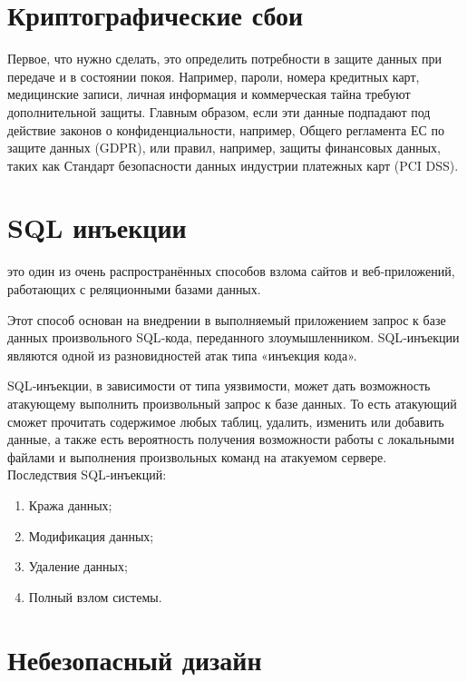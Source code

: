 \vspace{20pt}
{\let\clearpage\relax \chapter{Криптографические сбои}}

Первое, что нужно сделать, это определить потребности в защите данных при передаче и в состоянии покоя. Например, пароли, номера кредитных карт, медицинские записи, личная информация и коммерческая тайна требуют дополнительной защиты. Главным образом, если эти данные подпадают под действие законов о конфиденциальности, например, Общего регламента ЕС по защите данных (GDPR), или правил, например, защиты финансовых данных, таких как Стандарт безопасности данных индустрии платежных карт (PCI DSS). 

\vspace{20pt}
{\let\clearpage\relax \chapter{SQL инъекции}}

это один из очень распространённых способов взлома сайтов и веб‑приложений, работающих с реляционными базами данных.

Этот способ основан на внедрении в выполняемый приложением запрос к базе данных произвольного SQL‑кода, переданного злоумышленником. SQL‑инъекции являются одной из разновидностей атак типа «инъекция кода».

SQL‑инъекции, в зависимости от типа уязвимости, может дать возможность атакующему выполнить произвольный запрос к базе данных. То есть атакующий сможет прочитать содержимое любых таблиц, удалить, изменить или добавить данные, а также есть вероятность получения возможности работы с локальными файлами и выполнения произвольных команд на атакуемом сервере.\\

Последствия SQL‑инъекций:

\begin{enumerate}
    \item Кража данных;
    \item Модификация данных;
    \item Удаление данных;
    \item Полный взлом системы.
\end{enumerate}


\vspace{20pt}
{\let\clearpage\relax \chapter{Небезопасный дизайн}}

